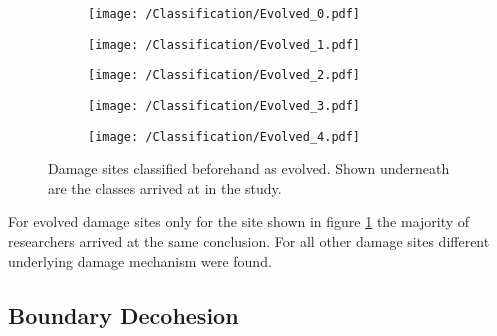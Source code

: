\begin{figure}[H]
\begin{subfigure}{.2\textwidth}
\centering
  \texttt{[image: /Classification/Evolved\_0.pdf]}
  \caption{}
  \label{fig:Ev1}
\end{subfigure}%
\begin{subfigure}{.2\textwidth}
\centering
  \texttt{[image: /Classification/Evolved\_1.pdf]}
  \caption{}
  \label{fig:Ev2}
\end{subfigure}%
\centering
\begin{subfigure}{.2\textwidth}
\centering
  \texttt{[image: /Classification/Evolved\_2.pdf]}
  \caption{}
  \label{fig:Ev3}
\end{subfigure}%
\begin{subfigure}{.2\textwidth}
\centering
  \texttt{[image: /Classification/Evolved\_3.pdf]}
  \caption{}
  \label{fig:Ev4}
\end{subfigure}%
\begin{subfigure}{.2\textwidth}
\centering
  \texttt{[image: /Classification/Evolved\_4.pdf]}
  \caption{}
  \label{fig:Ev5}
\end{subfigure}%
\caption{Damage sites classified beforehand as evolved. Shown underneath are the classes arrived at in the study.}
\label{fig:classes}
\end{figure}



For evolved damage sites only for the site shown in figure \ref{fig:Ev1} the majority of researchers arrived at the same conclusion. For all other damage sites different underlying damage mechanism were found.

\subsection{Boundary Decohesion}

